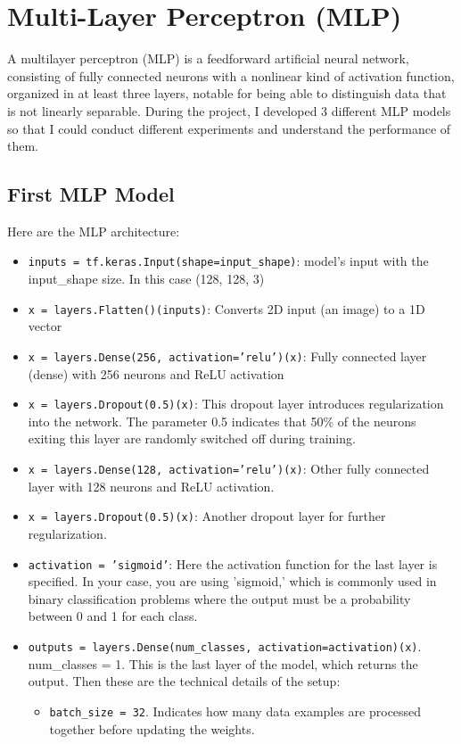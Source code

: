 \section{Multi-Layer Perceptron (MLP)}
A multilayer perceptron (MLP) is a feedforward artificial neural network, consisting of fully connected neurons with a nonlinear kind of activation function, organized in at least three layers, notable for being able to distinguish data that is not linearly separable. \cite{mlp}
During the project, I developed 3 different MLP models so that I could conduct different experiments and understand the performance of them.
\subsection{First MLP Model}
Here are the MLP architecture:
\begin{itemize}
\item \texttt{inputs = tf.keras.Input(shape=input\_shape)}: model's input with the input\_shape size. In this case (128, 128, 3)
\item \texttt{x = layers.Flatten()(inputs)}: Converts 2D input (an image) to a 1D vector
\item \texttt{x = layers.Dense(256, activation='relu')(x)}: Fully connected layer (dense) with 256 neurons and ReLU activation
\item \texttt{x = layers.Dropout(0.5)(x)}: This dropout layer introduces regularization into the network. The parameter 0.5 indicates that 50\% of the neurons exiting this layer are randomly switched off during training.
\item \texttt{x = layers.Dense(128, activation='relu')(x)}: Other fully connected layer with 128 neurons and ReLU activation.
\item \texttt{x = layers.Dropout(0.5)(x)}: Another dropout layer for further regularization.
\item \texttt{activation = 'sigmoid'}: Here the activation function for the last layer is specified. In your case, you are using 'sigmoid,' which is commonly used in binary classification problems where the output must be a probability between 0 and 1 for each class.
\item \texttt{outputs = layers.Dense(num\_classes, activation=activation)(x)}. \\
num\_classes = 1. This is the last layer of the model, which returns the output.
Then these are the technical details of the setup:
\begin{itemize}
\item \texttt{batch\_size =  32}. Indicates how many data examples are processed together before updating the weights.

\end{itemize}
\end{itemize}
